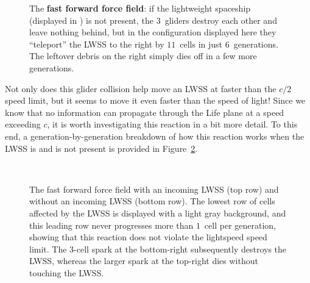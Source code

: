 \begin{figure}[!htb]
	\centering{}
	\caption{The \textbf{fast forward force field}: if the lightweight spaceship (displayed in ) is not present, the $3$~gliders destroy each other and leave nothing behind, but in the configuration displayed here they ``teleport'' the LWSS to the right by $11$~cells in just $6$~generations. The leftover debris on the right simply dies off in a few more generations.}\label{fig:fast_forward_force_field}
\end{figure}

Not only does this glider collision help move an LWSS at faster than the $c/2$ speed limit, but it seems to move it even faster than the speed of light! Since we know that no information can propagate through the Life plane at a speed exceeding $c$, it is worth investigating this reaction in a bit more detail. To this end, a generation-by-generation breakdown of how this reaction works when the LWSS is and is not present is provided in Figure~\ref{fig:ffff_analysis}.

\begin{figure}[!htb]
	\centering{}             \\[1.5em]
	
	            
	\caption{The fast forward force field with an incoming LWSS (top row) and without an incoming LWSS (bottom row). The lowest row of cells affected by the LWSS is displayed with a light gray background, and this leading row never progresses more than $1$~cell per generation, showing that this reaction does not violate the lightspeed speed limit. The $3$-cell spark at the bottom-right subsequently destroys the LWSS, whereas the larger spark at the top-right dies without touching the LWSS.}\label{fig:ffff_analysis}
\end{figure}

